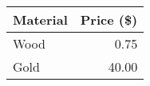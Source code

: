 \documentclass{standalone}
\begin{document}
\begin{tabular}{
		@{} %
		lr
		@{} %
	} 
	\toprule
	Material & Price (\$)\\ 
	\midrule

	Wood & 0.75 \\
	Gold & 40.00   \\

	\bottomrule
\end{tabular}
\end{document}
